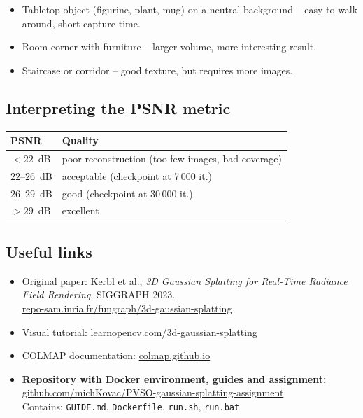 \documentclass{article}
\begin{document}
\begin{itemize}
    \item Tabletop object (figurine, plant, mug) on a neutral background --
          easy to walk around, short capture time.
    \item Room corner with furniture -- larger volume, more interesting result.
    \item Staircase or corridor -- good texture, but requires more images.
\end{itemize}

\subsection*{Interpreting the PSNR metric}

\begin{center}
\begin{tabular}{ll}
\toprule
PSNR & Quality \\
\midrule
$< 22$~dB & poor reconstruction (too few images, bad coverage) \\
$22$--$26$~dB & acceptable (checkpoint at 7\,000 it.) \\
$26$--$29$~dB & good (checkpoint at 30\,000 it.) \\
$> 29$~dB & excellent \\
\bottomrule
\end{tabular}
\end{center}

\subsection*{Useful links}

\begin{itemize}
    \item Original paper: Kerbl et al., \textit{3D Gaussian Splatting for
          Real-Time Radiance Field Rendering}, SIGGRAPH 2023.\\
          \href{https://repo-sam.inria.fr/fungraph/3d-gaussian-splatting/}{repo-sam.inria.fr/fungraph/3d-gaussian-splatting}
    \item Visual tutorial:
          \href{https://learnopencv.com/3d-gaussian-splatting/}{learnopencv.com/3d-gaussian-splatting}
    \item COLMAP documentation:
          \href{https://colmap.github.io/}{colmap.github.io}
    \item \textbf{Repository with Docker environment, guides and assignment:}\\
          \href{https://github.com/michKovac/PVSO-gaussian-splatting-assignment}{github.com/michKovac/PVSO-gaussian-splatting-assignment}\\
          Contains: \texttt{GUIDE.md}, \texttt{Dockerfile}, \texttt{run.sh}, \texttt{run.bat}
\end{itemize}
\end{document}
